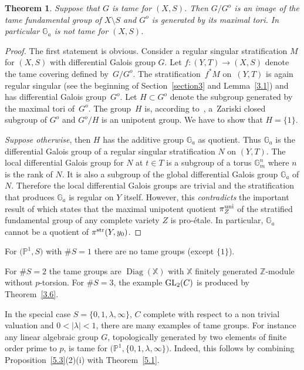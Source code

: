 \documentclass[pdftex]{sigma}
\numberwithin{equation}{section}
\newtheorem{Theorem}{Theorem}[section]
\begin{document}
\begin{Theorem}\label{3.7} Suppose that $G$ is tame for $(X,S)$. Then $G/G^o$ is an image of the tame fundamental group of $X\setminus S$ and $G^o$ is generated by its maximal tori. In particular $\mathbb{G}_a$ is not tame for $(X,S)$.
\end{Theorem}
\begin{proof} The first statement is obvious. Consider a regular singular stratification $M$ for $(X,S)$ with differential Galois group $G$. Let $f\colon (Y,T)\rightarrow (X,S)$ denote the tame covering defined by~$G/G^o$. The stratification~$f^*M$ on~$(Y,T)$ is again regular singular (see the beginning of Section~\ref{section3} and Lemma~\ref{3.1})
 and has differential Galois group~$G^o$. Let $H\subset G^o$ denote the subgroup generated by the maximal tori of~$G^o$. The group~$H$ is, according to~\cite[Proposition~13.3.10]{Sp}, a~Zariski closed subgroup of $G^o$ and $G^o/H$ is an unipotent group. We have to show that $H=\{1\}$.

{\it Suppose otherwise}, then $H$ has the additive group $\mathbb{G}_a$ as quotient. Thus $\mathbb{G}_a$ is the differential Galois group of a regular singular stratification $N$ on $(Y, T)$. The local differential Galois group for $N$ at $t\in T$ is a subgroup of a torus $\mathbb{G}_m^n$ where $n$ is the rank of $N$. It is also a subgroup of the global differential Galois group $\mathbb{G}_a$ of $N$. Therefore the local differential Galois groups are trivial and the stratification that produces $\mathbb{G}_a$ is regular on $Y$ itself. However, this {\it contradicts} the important result of \cite[Corollary~16]{Sa} which states that the maximal unipotent quotient $\pi _Z^{\rm uni}$ of the stratified fundamental group of any complete variety $Z$ is pro-\'etale. In particular, $\mathbb{G}_a$ cannot be a quotient of $\pi^{\rm str}(Y,y_0)$. \end{proof}

\begin{Examples} For $\big(\mathbb{P}^1,S\big)$ with $\#S=1$ there are no tame groups (except $\{1\}$).

For $\#S=2$ the tame groups are $\operatorname{Diag}(\mathbb{X})$ with $\mathbb{X}$ finitely generated $\mathbb{Z}$-module without $p$-torsion. For $\#S=3$, the example ${\rm GL}_2(C)$ is produced by Theorem~\ref{3.6}.

In the special case $S=\{0,1,\lambda ,\infty\}$, $C$ complete with respect to a non trivial valuation and $0<|\lambda |<1$, there are many examples of tame groups. For instance any linear algebraic group $G$, topologically generated by two elements of finite order prime to $p$, is tame for $\big(\mathbb{P}^1,\{0,1,\lambda ,\infty\}\big)$. Indeed, this follows by combining Proposition~\ref{5.3}(2)(i) with Theorem~\ref{5.1}.
\end{Examples}
\end{document}
